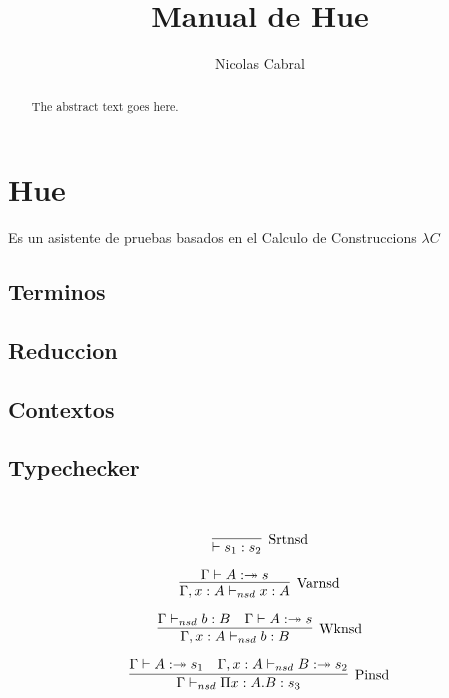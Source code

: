 \documentclass{article}
\theoremstyle{definition}
\theoremstyle{remark}
\begin{document}
\title{Manual de Hue}
\author{Nicolas Cabral}

\maketitle

\begin{abstract}
The abstract text goes here.
\end{abstract}

\section{Hue}

  Es un asistente de pruebas basados en el Calculo de Construccions $\lambda C$





\subsection{Terminos}
\subsection{Reduccion}
\subsection{Contextos}
\subsection{Typechecker}
~\cite{Jutting93checkingalgorithms}
~\cite{Benthem:93}
~\cite{DBLP:conf/types/JuttingMP93}

\begin{equation}
    \label{simple_equation}
\infer[\mathrm{Srtnsd}]
{\vdash s_{1} : s_{2}}{}
\end{equation}

\begin{equation}
    \label{simple_equation}
\infer[\mathrm{Varnsd}]
{\Gamma, x:A \vdash_{nsd} x : A}{\Gamma \vdash A :\twoheadrightarrow s}
\end{equation}

\begin{equation}
    \label{simple_equation}
\infer[\mathrm{Wknsd}]
{\Gamma, x:A \vdash_{nsd} b : B}{\Gamma \vdash_{nsd} b : B & \Gamma \vdash A :\twoheadrightarrow s}
\end{equation}

\begin{equation}
    \label{simple_equation}
\infer[\mathrm{Pinsd}]
{\Gamma \vdash_{nsd} \Pi x:A.B :s_{3}}{\Gamma \vdash A :\twoheadrightarrow s_{1} & \Gamma, x:A \vdash_{nsd} B :\twoheadrightarrow s_{2}}
\end{equation}
\end{document}
